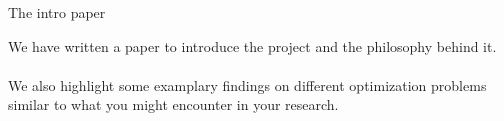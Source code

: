 \documentclass[unknownkeysallowed]{beamer}
\begin{document}
\begin{frame}{The intro paper}

    We have written a paper to introduce the project and the philosophy behind it.\\
    \vspace{1em}
    \cite{benchopt}\\
    \vspace{1em}
    We also highlight some examplary findings on different optimization problems similar to what you might encounter in your research.
\end{frame}


\end{document}

